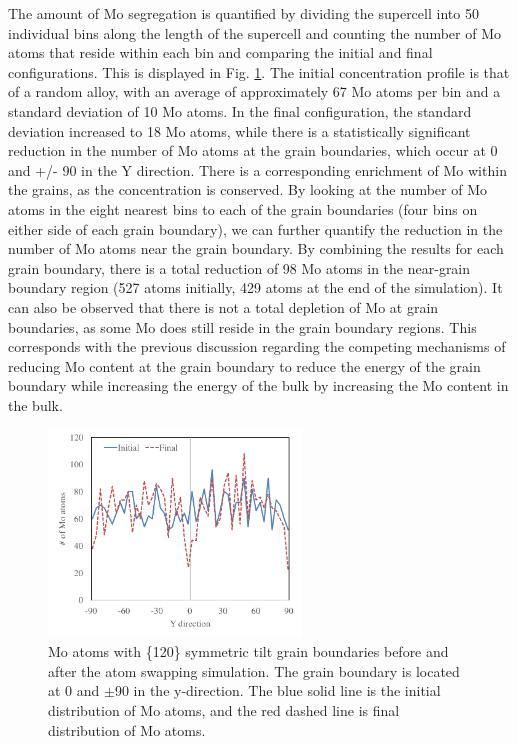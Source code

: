 \documentclass[review]{elsarticle}
\begin{document}
\FloatBarrier

The amount of Mo segregation is quantified by dividing the supercell into 50 individual bins along the length of the supercell and counting the number of Mo atoms that reside within each bin and comparing the initial and final configurations. This is displayed in Fig. \ref{fig:600mcmdA}. The initial concentration profile is that of a random alloy, with an average of approximately 67 Mo atoms per bin and a standard deviation of 10 Mo atoms. In the final configuration, the standard deviation increased to 18 Mo atoms, while there is a statistically significant reduction in the number of Mo atoms at the grain boundaries, which occur at 0 and +/- 90 in the Y direction. There is a corresponding enrichment of Mo within the grains, as the concentration is conserved. By looking at the number of Mo atoms in the eight nearest bins to each of the grain boundaries (four bins on either side of each grain boundary), we can further quantify the reduction in the number of Mo atoms near the grain boundary. By combining the results for each grain boundary, there is a total reduction of 98 Mo atoms in the near-grain boundary region (527 atoms initially, 429 atoms at the end of the simulation). It can also be observed that there is not a total depletion of Mo at grain boundaries, as some Mo does still reside in the grain boundary regions. This corresponds with the previous discussion regarding the competing mechanisms of reducing Mo content at the grain boundary to reduce the energy of the grain boundary while increasing the energy of the bulk by increasing the Mo content in the bulk.

\begin{figure}[h]
 \centering
 \includegraphics[width=0.6\textwidth]{600mcmdA.png} 
 \caption{Mo atoms with \{120\} symmetric tilt grain boundaries before and after the atom swapping simulation. The grain boundary is located at 0 and $\pm$90 in the y-direction. The blue solid line is the initial distribution of Mo atoms, and the red dashed line is final distribution of Mo atoms.}
 \label{fig:600mcmdA}
\end{figure}
\end{document}
